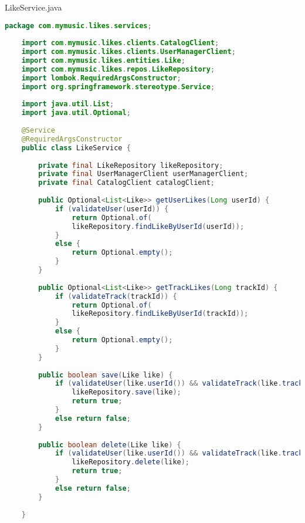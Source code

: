 LikeService.java
\begin{lstlisting}[language=java]
	package com.mymusic.likes.services;
	
	import com.mymusic.likes.clients.CatalogClient;
	import com.mymusic.likes.clients.UserManagerClient;
	import com.mymusic.likes.entities.Like;
	import com.mymusic.likes.repos.LikeRepository;
	import lombok.RequiredArgsConstructor;
	import org.springframework.stereotype.Service;
	
	import java.util.List;
	import java.util.Optional;
	
	@Service
	@RequiredArgsConstructor
	public class LikeService {
		
		private final LikeRepository likeRepository;
		private final UserManagerClient userManagerClient;
		private final CatalogClient catalogClient;
		
		public Optional<List<Like>> getUserLikes(Long userId) {
			if (validateUser(userId)) {
				return Optional.of(
				likeRepository.findLikeByUserId(userId));
			}
			else {
				return Optional.empty();
			}
		}
		
		public Optional<List<Like>> getTrackLikes(Long trackId) {
			if (validateTrack(trackId)) {
				return Optional.of(
				likeRepository.findLikeByUserId(trackId));
			}
			else {
				return Optional.empty();
			}
		}
		
		public boolean save(Like like) {
			if (validateUser(like.userId()) && validateTrack(like.trackId())) {
				likeRepository.save(like);
				return true;
			}
			else return false;
		}
		
		public boolean delete(Like like) {
			if (validateUser(like.userId()) && validateTrack(like.trackId())) {
				likeRepository.delete(like);
				return true;
			}
			else return false;
		}
		
	}
	
\end{lstlisting}

